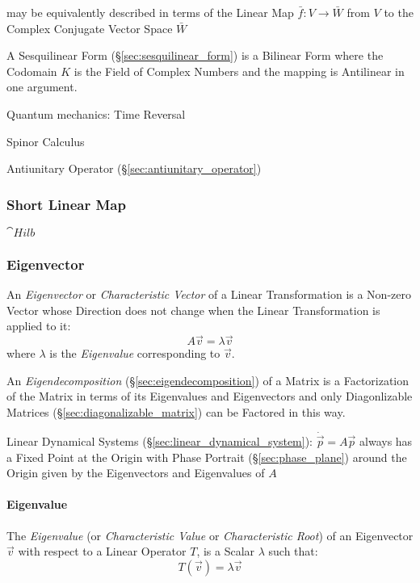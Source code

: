 may be equivalently described in terms of the Linear Map $\bar{f} : V
\rightarrow \bar{W}$ from $V$ to the Complex Conjugate Vector Space $\bar{W}$

A Sesquilinear Form (\S\ref{sec:sesquilinear_form}) is a Bilinear Form where
the Codomain $K$ is the Field of Complex Numbers and the mapping is Antilinear
in one argument.


Quantum mechanics: Time Reversal

Spinor Calculus

\fist Antiunitary Operator (\S\ref{sec:antiunitary_operator})



\subsubsection{Short Linear Map}\label{sec:short_linear}

$\cat{Hilb}$



\subsubsection{Eigenvector}\label{sec:eigenvector}

An \emph{Eigenvector} or \emph{Characteristic Vector} of a Linear
Transformation is a Non-zero Vector whose Direction does not change when the
Linear Transformation is applied to it:
\[
  A\vec{v} = \lambda\vec{v}
\]
where $\lambda$ is the \emph{Eigenvalue} corresponding to $\vec{v}$.

An \emph{Eigendecomposition} (\S\ref{sec:eigendecomposition}) of a Matrix is a
Factorization of the Matrix in terms of its Eigenvalues and Eigenvectors and
only Diagonlizable Matrices (\S\ref{sec:diagonalizable_matrix}) can be Factored
in this way.

\fist Linear Dynamical Systems (\S\ref{sec:linear_dynamical_system}):
$\dot{\vec{p}} = A\vec{p}$ always has a Fixed Point at the Origin with Phase
Portrait (\S\ref{sec:phase_plane}) around the Origin given by the Eigenvectors
and Eigenvalues of $A$



\paragraph{Eigenvalue}\label{sec:eigenvalue}\hfill

The \emph{Eigenvalue} (or \emph{Characteristic Value} or \emph{Characteristic
  Root}) of an Eigenvector $\vec{v}$ with respect to a Linear Operator $T$, is a
Scalar $\lambda$ such that:
\[
  T(\vec{v}) = \lambda\vec{v}
\]

